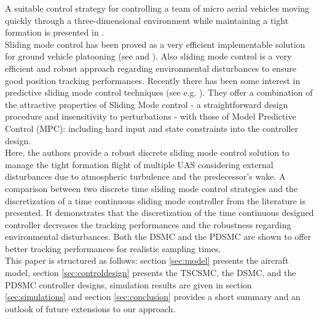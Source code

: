 \documentclass{ifacconf}
\begin{document}
A suitable control strategy for  controlling a team of micro aerial vehicles moving quickly through a three-dimensional environment while maintaining a tight formation is presented in \cite{turpin2012trajectory}. \\
Sliding mode control has been proved as a very efficient implementable solution for ground vehicle platooning (see \cite{ferrara2008sliding} and \cite{zou2013distributed}). Also sliding mode control is a very efficient and robust approach regarding environmental disturbances to ensure good position tracking performances. 
Recently there has been some interest in predictive sliding mode control techniques (see e.g. \cite{perez2010robust,houda2013new}). They offer a combination of the attractive properties of Sliding Mode control - a straightforward design procedure and insensitivity to perturbations - with those of Model Predictive Control (MPC): including hard input and state constraints into the controller design.\\
Here, the authors provide a robust discrete sliding mode control solution to manage the tight formation flight of multiple UAS considering external disturbances due to atmospheric turbulence and the predecessor's wake. A comparison between two discrete time sliding mode control strategies  and the discretization of a time continuous sliding mode controller from the literature is presented. It demonstrates that the discretization of the time continuous designed controller decreases the tracking performances and the robustness regarding environmental disturbances.
Both the DSMC and the PDSMC are shown to offer better tracking performances for realistic sampling times.\\
This paper is structured as follows: section \ref{sec:model} presents the aircraft model, section \ref{sec:controldesign} presents the TSCSMC, the DSMC, and the PDSMC controller designs, simulation results are given in section \ref{sec:simulations} and section \ref{sec:conclusion} provides a short summary and an outlook of future extensions to our approach.
\end{document}
